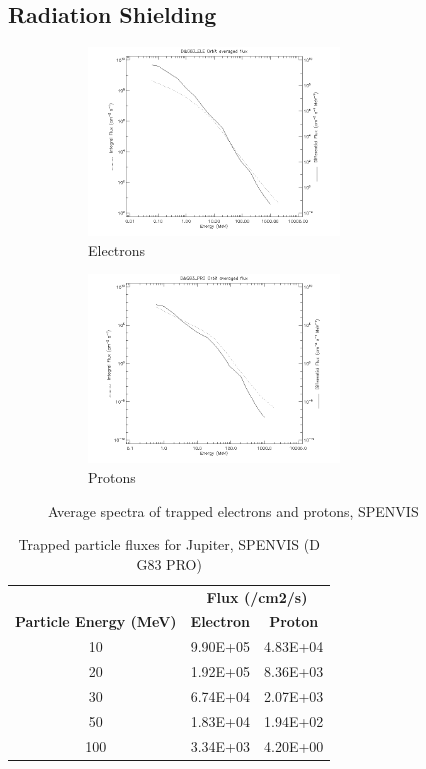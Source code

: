 \subsection{Radiation Shielding}
\begin{figure}[ht!]
\begin{subfigure}{0.5\textwidth}
\includegraphics[width=0.9\linewidth, height=5cm]{figures/Orbiter/electrons.png} 
\caption{Electrons}
\label{fig:elec}
\end{subfigure}
\begin{subfigure}{0.5\textwidth}
\includegraphics[width=0.9\linewidth, height=5cm]{figures/Orbiter/protons.png}
\caption{Protons}
\label{fig:prot}
\end{subfigure}
 
\caption{Average spectra of trapped electrons and protons, SPENVIS}
\label{fig:image2}
\end{figure}

\begin{table}[htbp]
  \centering
    \begin{tabular}{|c|c|c|}
    \hline
    \textbf{} & \multicolumn{2}{c|}{\textbf{Flux (/cm2/s)}} \bigstrut\\
\cline{2-3}    \textbf{Particle Energy (MeV)} & \textbf{Electron} & \textbf{Proton} \bigstrut\\
    \hline
    10    & 9.90E+05 & 4.83E+04 \bigstrut\\
    \hline
    20    & 1.92E+05 & 8.36E+03 \bigstrut\\
    \hline
    30    & 6.74E+04 & 2.07E+03 \bigstrut\\
    \hline
    50    & 1.83E+04 & 1.94E+02 \bigstrut\\
    \hline
    100   & 3.34E+03 & 4.20E+00 \bigstrut\\
    \hline
    \end{tabular}%
  \label{tab:particle_flux}%
  \caption{Trapped particle fluxes for Jupiter, SPENVIS (D G83 PRO)}
\end{table}%

